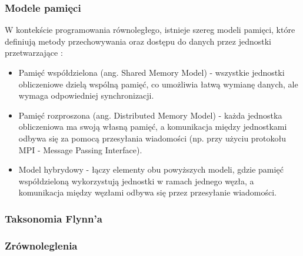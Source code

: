 \subsubsection{Modele pamięci}
W kontekście programowania równoległego, istnieje szereg modeli pamięci, które definiują metody przechowywania oraz dostępu do danych przez jednostki przetwarzające \cite{CUDA}:
\begin{itemize}
    \item Pamięć współdzielona (ang. Shared Memory Model) - wszystkie jednostki obliczeniowe dzielą wspólną pamięć, co umożliwia łatwą wymianę danych, ale wymaga odpowiedniej synchronizacji.
    \item Pamięć rozproszona (ang. Distributed Memory Model) - każda jednostka obliczeniowa ma swoją własną pamięć, a komunikacja między jednostkami odbywa się za pomocą przesyłania wiadomości (np. przy użyciu protokołu MPI - Message Passing Interface).
    \item Model hybrydowy - łączy elementy obu powyższych modeli, gdzie pamięć współdzieloną wykorzystują jednostki w ramach jednego węzła, a komunikacja między węzłami odbywa się przez przesyłanie wiadomości.
\end{itemize}
\subsubsection{Taksonomia Flynn'a}
\subsubsection{Zrównoleglenia}


